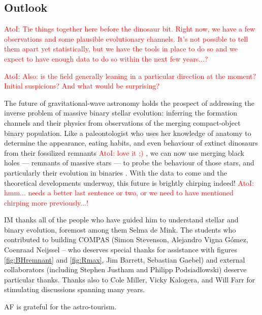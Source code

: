 \documentclass[iop,onecolumn]{revtex4}
\newcommand{\ajf}[1]{\textcolor{red}{AtoI: #1}}
\begin{document}
\subsection{Outlook}

\ajf{Tie things together here before the dinosaur bit. Right now, we have a few observations and some plausible evolutionary channels. It's not possible to tell them apart yet statistically, but we have the tools in place to do so and we expect to have enough data to do so within the next few years...? }

\ajf{Also: is the field generally leaning in a particular direction at the moment? Initial suspicions? And what would be surprising?}

The future of gravitational-wave astronomy holds the prospect of addressing the inverse problem of massive binary stellar evolution: inferring the formation channels and their physics from observations of the merging compact-object binary population.  Like a paleontologist who uses her knowledge of anatomy to determine the appearance, eating habits, and even behaviour of extinct dinosaurs from their fossilized remnants \ajf{love it ;) }, we can now use merging black holes --- remnants of massive stars --- to probe the behaviour of those stars, and particularly their evolution in binaries \citep{MandelFarmer:2017}.   With the data to come and the theoretical developments underway, this future is brightly chirping indeed! \ajf{hmm... needs a better last sentence or two, or we need to have mentioned chirping more previously...!}


\begin{acknowledgements}
IM thanks all of the people who have guided him to understand stellar and binary evolution, foremost among them Selma de Mink.   The students who contributed to building COMPAS (Simon Stevenson, Alejandro Vigna G\'{o}mez, Coenraad Neijssel -- who deserves special thanks for assistance with figures \ref{fig:BHremnant} and \ref{fig:Rmax}, Jim Barrett, Sebastian Gaebel) and external collaborators (including Stephen Justham and Philipp Podsiadlowski) deserve particular thanks.  Thanks also to Cole Miller, Vicky Kalogera, and Will Farr for stimulating discussions spanning many years. 

AF is grateful for the astro-tourism.
\end{acknowledgements}



\end{document}
